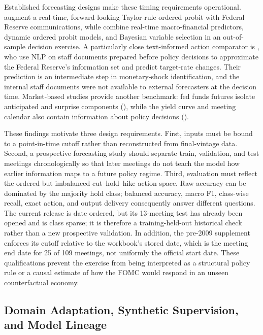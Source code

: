 Established forecasting designs make these timing requirements operational.
\citet{hayo2010federal} augment a real-time, forward-looking Taylor-rule
ordered probit with Federal Reserve communications, while
\citet{vandendhauwe2013bayesian} combine real-time macro-financial predictors,
dynamic ordered probit models, and Bayesian variable selection in an
out-of-sample decision exercise. A particularly close text-informed action
comparator is \citet{aruoba2024identifying}, who use NLP on staff documents prepared
before policy decisions to approximate the Federal Reserve's information set
and predict target-rate changes. Their prediction is an intermediate step in
monetary-shock identification, and the internal staff documents were not
available to external forecasters at the decision time. Market-based studies
provide another benchmark: fed funds futures isolate anticipated and surprise
components (\cite{kuttner2001monetary}), while the yield curve and meeting
calendar also contain information about policy decisions
(\cite{piazzesi2005bond}).

These findings motivate three design requirements. First, inputs must be bound
to a point-in-time cutoff rather than reconstructed from final-vintage data.
Second, a prospective forecasting study should separate train, validation,
and test meetings chronologically so that later meetings do not teach the
model how earlier information maps to a future policy regime. Third,
evaluation must reflect the ordered but imbalanced cut--hold--hike action
space. Raw accuracy can be dominated by the majority hold class; balanced
accuracy, macro F1, class-wise recall, exact action, and output delivery
consequently answer different questions. The current release is date ordered,
but its 13-meeting test has already been opened and is class sparse; it is
therefore a training-held-out historical check rather than a new prospective
validation. In addition, the pre-2009 supplement enforces its cutoff relative
to the workbook's stored date, which is the meeting end date for 25 of 109
meetings, not uniformly the official start date. These qualifications prevent
the exercise from being interpreted as a structural policy rule or a causal
estimate of how the FOMC would respond in an unseen counterfactual economy.

\subsection{Domain Adaptation, Synthetic Supervision, and Model Lineage}
\label{ch2:sec:lr:adaptation}


